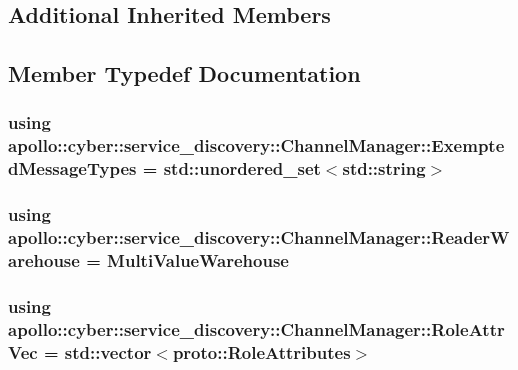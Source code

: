 \subsection*{Additional Inherited Members}


\subsection{Member Typedef Documentation}
\hypertarget{classapollo_1_1cyber_1_1service__discovery_1_1ChannelManager_a5ce07d9955d5944b039583db211c2d25}{
\subsubsection[{Exempted\-Message\-Types}]{\setlength{\rightskip}{0pt plus 5cm}using {\bf apollo\-::cyber\-::service\-\_\-discovery\-::\-Channel\-Manager\-::\-Exempted\-Message\-Types} =  std\-::unordered\-\_\-set$<$std\-::string$>$}}\label{classapollo_1_1cyber_1_1service__discovery_1_1ChannelManager_a5ce07d9955d5944b039583db211c2d25}
\hypertarget{classapollo_1_1cyber_1_1service__discovery_1_1ChannelManager_adf7b96601a2dec7f06fb190d1a7b537d}{
\subsubsection[{Reader\-Warehouse}]{\setlength{\rightskip}{0pt plus 5cm}using {\bf apollo\-::cyber\-::service\-\_\-discovery\-::\-Channel\-Manager\-::\-Reader\-Warehouse} =  {\bf Multi\-Value\-Warehouse}}}\label{classapollo_1_1cyber_1_1service__discovery_1_1ChannelManager_adf7b96601a2dec7f06fb190d1a7b537d}
\hypertarget{classapollo_1_1cyber_1_1service__discovery_1_1ChannelManager_a3690fc3677abdb994d1de9b996f66cf6}{
\subsubsection[{Role\-Attr\-Vec}]{\setlength{\rightskip}{0pt plus 5cm}using {\bf apollo\-::cyber\-::service\-\_\-discovery\-::\-Channel\-Manager\-::\-Role\-Attr\-Vec} =  std\-::vector$<$proto\-::\-Role\-Attributes$>$}}\label{classapollo_1_1cyber_1_1service__discovery_1_1ChannelManager_a3690fc3677abdb994d1de9b996f66cf6}
